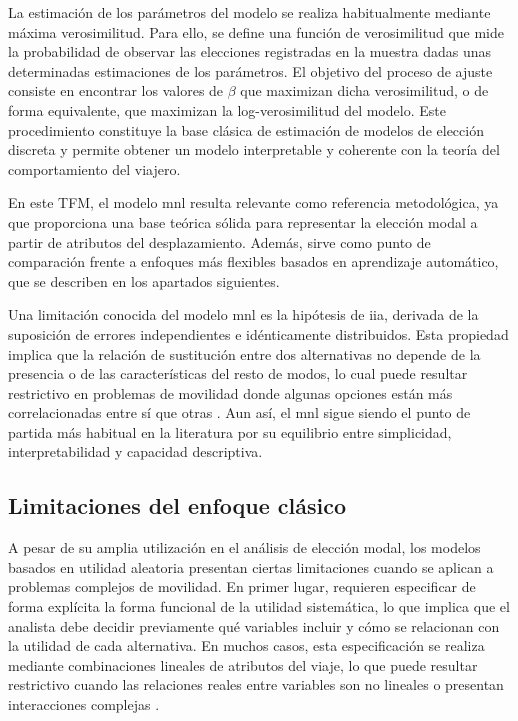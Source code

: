La estimación de los parámetros del modelo se realiza habitualmente mediante máxima verosimilitud. Para ello, se define una función de verosimilitud que mide la probabilidad de observar las elecciones registradas en la muestra dadas unas determinadas estimaciones de los parámetros. El objetivo del proceso de ajuste consiste en encontrar los valores de $\beta$ que maximizan dicha verosimilitud, o de forma equivalente, que maximizan la log-verosimilitud del modelo. Este procedimiento constituye la base clásica de estimación de modelos de elección discreta y permite obtener un modelo interpretable y coherente con la teoría del comportamiento del viajero.\newline

En este TFM, el modelo \gls{mnl} resulta relevante como referencia metodológica, ya que proporciona una base teórica sólida para representar la elección modal a partir de atributos del desplazamiento. Además, sirve como punto de comparación frente a enfoques más flexibles basados en aprendizaje automático, que se describen en los apartados siguientes.\newline

Una limitación conocida del modelo \gls{mnl} es la hipótesis de \gls{iia}, derivada de la suposición de errores independientes e idénticamente distribuidos. Esta propiedad implica que la relación de sustitución entre dos alternativas no depende de la presencia o de las características del resto de modos, lo cual puede resultar restrictivo en problemas de movilidad donde algunas opciones están más correlacionadas entre sí que otras \cite{McFadden1974,Train2009}. Aun así, el \gls{mnl} sigue siendo el punto de partida más habitual en la literatura por su equilibrio entre simplicidad, interpretabilidad y capacidad descriptiva.



\subsection{Limitaciones del enfoque clásico}

A pesar de su amplia utilización en el análisis de elección modal, los modelos basados en utilidad aleatoria presentan ciertas limitaciones cuando se aplican a problemas complejos de movilidad. En primer lugar, requieren especificar de forma explícita la forma funcional de la utilidad sistemática, lo que implica que el analista debe decidir previamente qué variables incluir y cómo se relacionan con la utilidad de cada alternativa. En muchos casos, esta especificación se realiza mediante combinaciones lineales de atributos del viaje, lo que puede resultar restrictivo cuando las relaciones reales entre variables son no lineales o presentan interacciones complejas \cite[p.~20]{MartinBaos2023Thesis}.\newline


